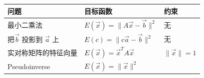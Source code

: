 \documentclass[
]{book}
\begin{document}
\begin{longtable}[]{@{}lll@{}}
\toprule
\begin{minipage}[b]{0.30\columnwidth}\raggedright
问题\strut
\end{minipage} & \begin{minipage}[b]{0.30\columnwidth}\raggedright
目标函数\strut
\end{minipage} & \begin{minipage}[b]{0.30\columnwidth}\raggedright
约束\strut
\end{minipage}\tabularnewline
\midrule
\endhead
\begin{minipage}[t]{0.30\columnwidth}\raggedright
最小二乘法\strut
\end{minipage} & \begin{minipage}[t]{0.30\columnwidth}\raggedright
\(E(\vec{x}) = \parallel A\vec{x} - \vec{b} \parallel^2\)\strut
\end{minipage} & \begin{minipage}[t]{0.30\columnwidth}\raggedright
无\strut
\end{minipage}\tabularnewline
\begin{minipage}[t]{0.30\columnwidth}\raggedright
把\(\vec{b}\) 投影到 \(\vec{a}\) 上\strut
\end{minipage} & \begin{minipage}[t]{0.30\columnwidth}\raggedright
\(E(c) = \parallel c\vec{a} - \vec{b} \parallel^2\)\strut
\end{minipage} & \begin{minipage}[t]{0.30\columnwidth}\raggedright
无\strut
\end{minipage}\tabularnewline
\begin{minipage}[t]{0.30\columnwidth}\raggedright
实对称矩阵的特征向量\strut
\end{minipage} & \begin{minipage}[t]{0.30\columnwidth}\raggedright
\(E(\vec{x}) = \vec{x}^TA\vec{x}\)\strut
\end{minipage} & \begin{minipage}[t]{0.30\columnwidth}\raggedright
\(\parallel \vec{x} \parallel = 1\)\strut
\end{minipage}\tabularnewline
\begin{minipage}[t]{0.30\columnwidth}\raggedright
Pseudoinverse\strut
\end{minipage} & \begin{minipage}[t]{0.30\columnwidth}\raggedright
\(E(\vec{x}) = \parallel \vec{x} \parallel^2\)\strut
\end{minipage} & \begin{minipage}[t]{0.30\columnwidth}\raggedright

\end{minipage}
\end{longtable}
\end{document}
